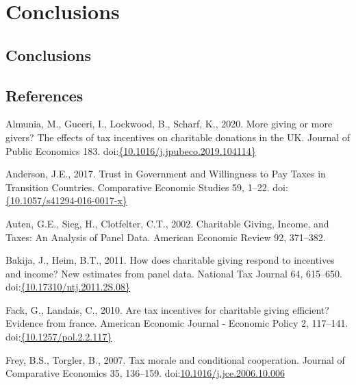 \documentclass[ review  , 3p ]{elsarticle}
\begin{document}
  \hypertarget{conclusions}{%
  \section{Conclusions}\label{conclusions}}
  
  \hypertarget{conclusions-1}{%
  \subsection{Conclusions}\label{conclusions-1}}
  
  \clearpage
  
  \hypertarget{references}{%
  \subsection*{References}\label{references}}
  
  \hypertarget{refs}{}
  \leavevmode\hypertarget{ref-Almunia2020}{}%
  Almunia, M., Guceri, I., Lockwood, B., Scharf, K., 2020. More giving or more givers? The effects of tax incentives on charitable donations in the UK. Journal of Public Economics 183. doi:\href{https://doi.org/\%7B10.1016/j.jpubeco.2019.104114\%7D}{\{10.1016/j.jpubeco.2019.104114\}}
  
  \leavevmode\hypertarget{ref-Anderson2017}{}%
  Anderson, J.E., 2017. Trust in Government and Willingness to Pay Taxes in Transition Countries. Comparative Economic Studies 59, 1--22. doi:\href{https://doi.org/\%7B10.1057/s41294-016-0017-x\%7D}{\{10.1057/s41294-016-0017-x\}}
  
  \leavevmode\hypertarget{ref-Auten2002}{}%
  Auten, G.E., Sieg, H., Clotfelter, C.T., 2002. Charitable Giving, Income, and Taxes: An Analysis of Panel Data. American Economic Review 92, 371--382.
  
  \leavevmode\hypertarget{ref-Bakija2011}{}%
  Bakija, J., Heim, B.T., 2011. How does charitable giving respond to incentives and income? New estimates from panel data. National Tax Journal 64, 615--650. doi:\href{https://doi.org/\%7B10.17310/ntj.2011.2S.08\%7D}{\{10.17310/ntj.2011.2S.08\}}
  
  \leavevmode\hypertarget{ref-Fack2010}{}%
  Fack, G., Landais, C., 2010. Are tax incentives for charitable giving efficient? Evidence from france. American Economic Journal - Economic Policy 2, 117--141. doi:\href{https://doi.org/\%7B10.1257/pol.2.2.117\%7D}{\{10.1257/pol.2.2.117\}}
  
  \leavevmode\hypertarget{ref-Frey2007}{}%
  Frey, B.S., Torgler, B., 2007. Tax morale and conditional cooperation. Journal of Comparative Economics 35, 136--159. doi:\href{https://doi.org/10.1016/j.jce.2006.10.006}{10.1016/j.jce.2006.10.006}
  
\end{document}
